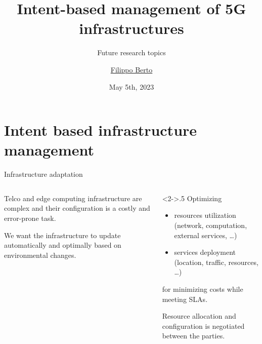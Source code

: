 \documentclass[xcolor={usenames,dvipsnames,svgnames}]{beamer}
\title{Intent-based management of 5G infrastructures}
\subtitle{Future research topics}
\author{\href{mailto:filippo.berto@unimi.it}{Filippo Berto}}
\date{May 5th, 2023}
\begin{document}
\maketitle

\section{Intent based infrastructure management}

\begin{frame}{Infrastructure adaptation}
	\begin{columns}
		\begin{column}{.4\textwidth}
			Telco and edge computing infrastructure are \alert{complex} and their configuration is a \alert{costly} and \alert{error-prone} task. \vspace{1em}

			We want the infrastructure to \alert{update automatically} and \alert{optimally} based on environmental changes.
		\end{column}
		\begin{column}<2->{.5\textwidth}
			Optimizing
			\begin{itemize}
				\item resources utilization (network, computation, external services, \ldots)
				\item services deployment (location, traffic, resources, \ldots)
			\end{itemize}
			for \alert{minimizing costs} while meeting \alert{\glspl{SLA}}.\vspace{1em}

			Resource allocation and configuration is \alert{negotiated} between the parties.
		\end{column}
	\end{columns}
\end{frame}
\end{document}
